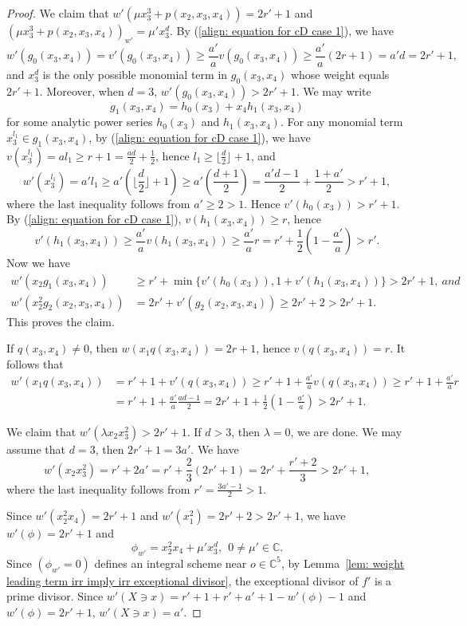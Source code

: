 \documentclass[11pt]{amsart}
\numberwithin{equation}{section}
\newcommand{\Cc}{\mathbb{C}}
\theoremstyle{definition}
\theoremstyle{definition}
\begin{document}
\begin{proof}
We claim that $w'(\mu x_3^3+p(x_2,x_3,x_4))= 2r'+1$ and $(\mu x_3^3+p(x_2,x_3,x_4))_{w'}=\mu' x_3^d$. By (\ref{align: equation for cD case 1}), we have $$w'(g_0(x_3,x_4))=v'(g_0(x_3,x_4))\geq \frac{a'}{a}v(g_0(x_3,x_4))\geq \frac{a'}{a}(2r+1)=a'd=2r'+1,$$ and $x_3^{d}$ is the only possible monomial term in $g_0(x_3,x_4)$ whose weight equals $2r'+1$. Moreover, when $d=3$, $w'(g_0(x_3,x_4))>2r'+1$. We may write $$g_1(x_3,x_4)=h_0(x_3)+x_4h_1(x_3,x_4)$$ for some analytic power series $h_0(x_3)$ and $h_1(x_3,x_4)$. For any monomial term $x_3^{l_1}\in g_1(x_3,x_4)$, by (\ref{align: equation for cD case 1}), we have $v(x_3^{l_1})=al_1\geq r+1=\frac{ad}{2}+\frac{1}{2}$, hence $l_1\geq \lfloor \frac{d}{2}\rfloor+1$, and $$w'(x_3^{l_1})=a'l_1\geq a'(\lfloor \frac{d}{2}\rfloor+1)\geq a'(\frac{d+1}{2})=\frac{a'd-1}{2}+\frac{1+a'}{2}>r'+1,$$ where the last inequality follows from $a'\geq 2>1$. Hence $v'(h_0(x_3))>r'+1$. By (\ref{align: equation for cD case 1}), $v(h_1(x_3,x_4))\geq r$, hence $$v'(h_1(x_3,x_4))\geq \frac{a'}{a}v(h_1(x_3,x_4))\geq \frac{a'}{a}r=r'+\frac{1}{2}(1-\frac{a'}{a})>r'.$$ Now we have
\begin{align*}
    w'(x_2g_1(x_3,x_4))&\geq r'+\min\{v'(h_0(x_3)),1+v'(h_1(x_3,x_4))\}>2r'+1,\ and\\
    w'(x_2^2g_2(x_2,x_3,x_4))&=2r'+v'(g_2(x_2,x_3,x_4))\geq 2r'+2>2r'+1.
\end{align*}
This proves the claim.

If $q(x_3,x_4)\neq 0$, then $w(x_1q(x_3,x_4))=2r+1$, hence $v(q(x_3,x_4))=r$. It follows that
\begin{align*}
    w'(x_1q(x_3,x_4))&=r'+1+v'(q(x_3,x_4))\geq r'+1+\frac{a'}{a}v(q(x_3,x_4))\geq r'+1+\frac{a'}{a}r\\
    &=r'+1+\frac{a'}{a}\frac{ad-1}{2}=2r'+1+\frac{1}{2}(1-\frac{a'}{a})>2r'+1.
\end{align*}

We claim that $w'(\lambda x_2x_3^2)>2r'+1$. If $d>3$, then $\lambda =0$, we are done. We may assume that $d=3$, then $2r'+1=3a'$. We have $$w'(x_2x_3^2)=r'+2a'=r'+\frac{2}{3}(2r'+1)=2r'+\frac{r'+2}{3}>2r'+1,$$ where the last inequality follows from $r'=\frac{3a'-1}{2}>1$.

Since $w'(x_2^2x_4)=2r'+1$ and $w'(x_1^2)=2r'+2>2r'+1$, we have $w'(\phi)=2r'+1$ and $$\phi_{w'}=x_2^2x_4+\mu'x_3^d,\ \ 0\neq\mu'\in \Cc.$$ Since $(\phi_{w'}=0)$ defines an integral scheme near $o\in \Cc^5$, by Lemma~\ref{lem: weight leading term irr imply irr exceptional divisor}, the exceptional divisor of $f'$ is a prime divisor. Since $w'(X\ni x)=r'+1+r'+a'+1-w'(\phi)-1$ and $w'(\phi)=2r'+1$, $w'(X\ni x)=a'$.



\end{proof}
\end{document}
